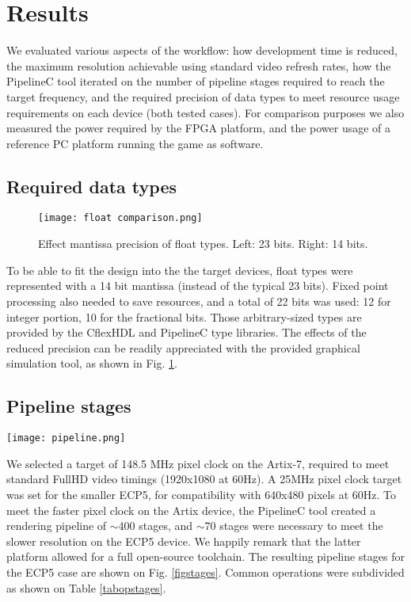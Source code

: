 \documentclass[conference]{IEEEtran}
\begin{document}
\section{Results}

We evaluated various aspects of the workflow: how development time is reduced, the maximum resolution achievable using standard video refresh rates, how the PipelineC tool iterated on the number of pipeline stages required to reach the target frequency, and the required precision of data types to meet resource usage requirements on each device (both tested cases). For comparison purposes we also measured the power required by the FPGA platform, and the power usage of a reference PC platform running the game as software.

\subsection{Required data types}

\begin{figure}
\texttt{[image: float comparison.png]}
\caption{Effect mantissa precision of float types. Left: 23 bits. Right: 14 bits.}
\label{figprec}
\end{figure}

To be able to fit the design into the the target devices, float types were represented with a 14 bit mantissa (instead of the typical 23 bits). Fixed point processing also needed to save resources, and a total of 22 bits was used: 12 for integer portion, 10 for the fractional bits. Those arbitrary-sized types are provided by the CflexHDL and PipelineC type libraries. The effects of the reduced precision can be readily appreciated with the provided graphical simulation tool, as shown in Fig. \ref{figprec}.

\subsection{Pipeline stages}


\begin{figure*}
\texttt{[image: pipeline.png]}
\caption{Resulting pipeline for the ECP5 target.}
\label{figstages}
\end{figure*}

We selected a target of 148.5 MHz pixel clock on the Artix-7, required to meet standard FullHD video timings (1920x1080 at 60Hz). A 25MHz pixel clock target was set for the smaller ECP5, for compatibility with 640x480 pixels at 60Hz.
To meet the faster pixel clock on the Artix device, the PipelineC tool created a rendering pipeline of $\sim$400 stages, and $\sim$70 stages were necessary to meet the slower resolution on the ECP5 device. We happily remark that the latter platform allowed for a full open-source toolchain. The resulting pipeline stages for the ECP5 case are shown on Fig. \ref{figstages}. Common operations were subdivided as shown on Table \ref{tabopstages}.
\end{document}
